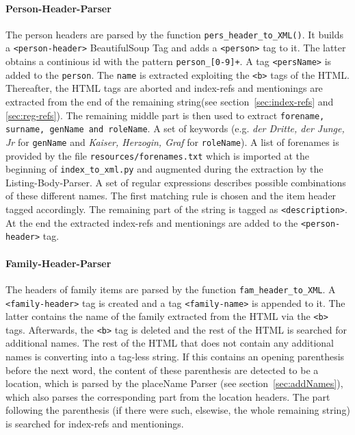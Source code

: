 \paragraph{Person-Header-Parser}
The person headers are parsed by the function \texttt{pers\_header\_to\_XML()}. It builds a \texttt{<person-header>} BeautifulSoup Tag and adds a \texttt{<person>} tag to it. The latter obtains a continious id with the pattern \texttt{person\_[0-9]+}. A tag \texttt{<persName>} is added to the \texttt{person}. The \texttt{name} is extracted exploiting the \texttt{<b>} tags of the HTML. Thereafter, the HTML tags are aborted and index-refs and mentionings are extracted from the end of the remaining string(see section~\ref{sec:index-refs} and \ref{sec:reg-refs}). The remaining middle part is then used to extract \texttt{forename, surname, genName and roleName}. A set of keywords (e.g. \textit{der Dritte, der Junge, Jr} for \texttt{genName} and \textit{Kaiser, Herzogin, Graf} for \texttt{roleName}). A list of forenames is provided by the file \texttt{resources/forenames.txt} which is imported at the beginning of \texttt{index\_to\_xml.py} and augmented during the extraction by the Listing-Body-Parser. A set of regular expressions describes possible combinations of these different names. The first matching rule is chosen and the item header tagged accordingly. The remaining part of the string is tagged as \texttt{<description>}. At the end the extracted index-refs and mentionings are added to the \texttt{<person-header>} tag.

\paragraph{Family-Header-Parser}
The headers of family items are parsed by the function \texttt{fam\_header\_to\_XML}. A \texttt{<family-header>} tag is created and a tag \texttt{<family-name>} is appended to it. The latter contains the name of the family extracted from the HTML via the \texttt{<b>} tags. Afterwards, the \texttt{<b>} tag is deleted and the rest of the HTML is searched for additional names. The rest of the HTML that does not contain any additional names is converting into a tag-less string. If this contains an opening parenthesis before the next word, the content of these parenthesis are detected to be a location, which is parsed by the placeName Parser (see section~\ref{sec:addNames}), which also parses the corresponding part from the location headers. The part following the parenthesis (if there were such, elsewise, the whole remaining string) is searched for index-refs and mentionings.

